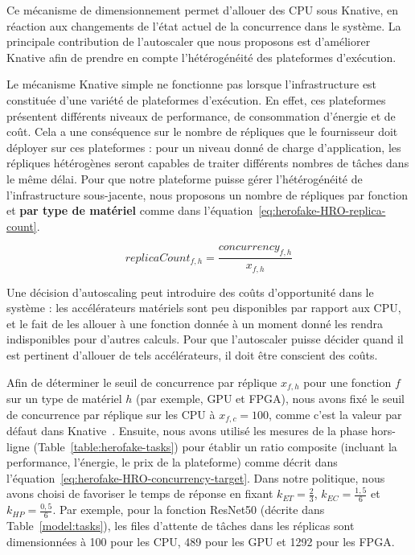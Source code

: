 Ce mécanisme de dimensionnement permet d'allouer des CPU sous Knative, en réaction aux changements de l'état actuel de la concurrence dans le système. La principale contribution de l'autoscaler que nous proposons est d'améliorer Knative afin de prendre en compte l'hétérogénéité des plateformes d'exécution.

Le mécanisme Knative simple ne fonctionne pas lorsque l'infrastructure est constituée d'une variété de plateformes d'exécution. En effet, ces plateformes présentent différents niveaux de performance, de consommation d'énergie et de coût. Cela a une conséquence sur le nombre de répliques que le fournisseur doit déployer sur ces plateformes : pour un niveau donné de charge d'application, les répliques hétérogènes seront capables de traiter différents nombres de tâches dans le même délai. Pour que notre plateforme puisse gérer l'hétérogénéité de l'infrastructure sous-jacente, nous proposons un nombre de répliques par fonction et \textbf{par type de matériel} comme dans l'équation~\ref{eq:herofake-HRO-replica-count}.

\begin{equation}
    replicaCount_{f, h} = \frac{concurrency_{f, h}}{x_{f, h}}
\label{eq:herofake-HRO-replica-count}
\end{equation}

Une décision d'autoscaling peut introduire des coûts d'opportunité dans le système : les accélérateurs matériels sont peu disponibles par rapport aux CPU, et le fait de les allouer à une fonction donnée à un moment donné les rendra indisponibles pour d'autres calculs. Pour que l'autoscaler puisse décider quand il est pertinent d'allouer de tels accélérateurs, il doit être conscient des coûts. 

Afin de déterminer le seuil de concurrence par réplique $x_{f, h}$ pour une fonction $f$ sur un type de matériel $h$ (par exemple, GPU et FPGA), nous avons fixé le seuil de concurrence par réplique sur les CPU à $x_{f, c} = 100$, comme c'est la valeur par défaut dans Knative~\cite{knative-concurrency}. Ensuite, nous avons utilisé les mesures de la phase hors-ligne (Table~\ref{table:herofake-tasks}) pour établir un ratio composite (incluant la performance, l'énergie, le prix de la plateforme) comme décrit dans l'équation~\ref{eq:herofake-HRO-concurrency-target}. Dans notre politique, nous avons choisi de favoriser le temps de réponse en fixant $k_{ET} = \frac{2}{3}$, $k_{EC} = \frac{1,5}{6}$ et $k_{HP} = \frac{0,5}{6}$. Par exemple, pour la fonction ResNet50 (décrite dans Table~\ref{model:tasks}), les files d'attente de tâches dans les réplicas sont dimensionnées à 100 pour les CPU, 489 pour les GPU et 1292 pour les FPGA.

